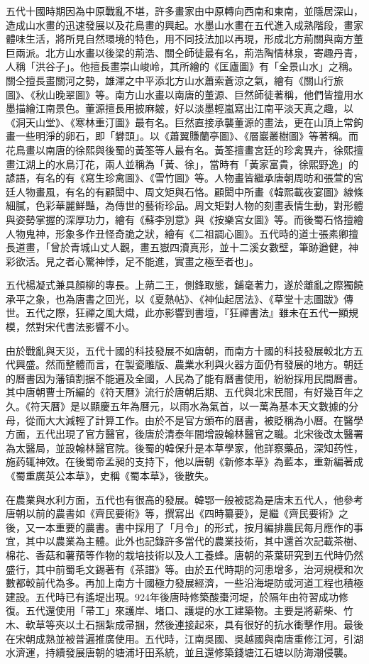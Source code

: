 五代十國時期因為中原戰亂不堪，許多畫家由中原轉向西南和東南，並隱居深山，造成山水畫的迅速發展以及花鳥畫的興起。水墨山水畫在五代進入成熟階段，畫家體味生活，將所見自然環境的特色，用不同技法加以再現，形成北方荊關與南方董巨兩派。北方山水畫以後梁的荊浩、關仝師徒最有名，荊浩陶情林泉，寄趣丹青，人稱「洪谷子」。他擅長畫崇山峻岭，其所繪的《匡廬圖》有「全景山水」之稱。關仝擅長畫關河之勢，雄渾之中平添北方山水蕭索蒼涼之氣，繪有《關山行旅圖》、《秋山晚翠圖》等。南方山水畫以南唐的董源、巨然師徒著稱，他們皆擅用水墨描繪江南景色。董源擅長用披麻皴，好以淡墨輕嵐寫出江南平淡天真之趣，以《洞天山堂》、《寒林重汀圖》最有名。巨然直接承襲董源的畫法，更在山頂上常鉤畫一些明淨的卵石，即「礬頭」。以《蕭翼賺蘭亭圖》、《層巖叢樹圖》等著稱。而花鳥畫以南唐的徐熙與後蜀的黃筌等人最有名。黃筌擅畫宮廷的珍禽異卉，徐熙擅畫江湖上的水鳥汀花，兩人並稱為「黃、徐」，當時有「黃家富貴，徐熙野逸」的諺語，有名的有《寫生珍禽圖》、《雪竹圖》等。人物畫皆繼承唐朝周昉和張萱的宮廷人物畫風，有名的有顧閎中、周文矩與石恪。顧閎中所畫《韓熙載夜宴圖》線條細膩，色彩華麗鮮豔，為傳世的藝術珍品。周文矩對人物的刻畫表情生動，對形體與姿勢掌握的深厚功力，繪有《蘇李別意》與《按樂宮女圖》等。而後蜀石恪擅繪人物鬼神，形象多作丑怪奇詭之狀，繪有《二祖調心圖》。五代時的道士張素卿擅長道畫，「曾於青城山丈人觀，畫五嶽四瀆真形，並十二溪女數壁，筆跡遒健，神彩欲活。見之者心驚神悸，足不能進，實畫之極至者也」。

五代楊凝式兼具顏柳的專長。上蒴二王，側鋒取態，鋪毫著力，遂於離亂之際獨饒承平之象，也為唐書之回光，以《夏熱帖》、《神仙起居法》、《草堂十志圖跋》傳世。五代之際，狂禪之風大熾，此亦影響到書壇，『狂禪書法』雖未在五代一顯規模，然對宋代書法影響不小。

由於戰亂與天災，五代十國的科技發展不如唐朝，而南方十國的科技發展較北方五代興盛。然而整體而言，在製瓷雕版、農業水利與火器方面仍有發展的地方。朝廷的曆書因为藩镇割据不能遍及全國，人民為了能有曆書使用，紛紛採用民間曆書。其中唐朝曹士所編的《符天曆》流行於唐朝后期、五代與北宋民間，有好幾百年之久。《符天曆》是以顯慶五年為曆元，以雨水為氣首，以一萬為基本天文數據的分母，從而大大減輕了計算工作。由於不是官方頒布的曆書，被貶稱為小曆。在醫學方面，五代出現了官方醫官，後唐於清泰年間增設翰林醫官之職。北宋後改太醫署為太醫局，並設翰林醫官院。後蜀的韓保升是本草學家，他詳察藥品，深知药性，施药辄神效。在後蜀帝孟昶的支持下，他以唐朝《新修本草》為藍本，重新編著成《蜀重廣英公本草》，史稱《蜀本草》，後散失。

在農業與水利方面，五代也有很高的發展。韓鄂一般被認為是唐末五代人，他參考唐朝以前的農書如《齊民要術》等，撰寫出《四時纂要》，是繼《齊民要術》之後，又一本重要的農書。書中採用了「月令」的形式，按月編排農民每月應作的事宜，其中以農業為主體。此外也記錄許多當代的農業技術，其中還首次記載茶樹、棉花、香菇和薯蕷等作物的栽培技術以及人工養蜂。唐朝的茶葉研究到五代時仍然盛行，其中前蜀毛文錫著有《茶譜》等。由於五代時期的河患增多，治河規模和次數都較前代為多。再加上南方十國極力發展經濟，一些沿海堤防或河道工程也積極建設。五代時已有遙堤出現。924年後唐時修築酸棗河堤，於隔年由符習成功修復。五代還使用「帚工」來護岸、堵口、護堤的水工建築物。主要是將薪柴、竹木、軟草等夾以土石捆紮成帚捆，然後連接起來，具有很好的抗水衝擊作用。最後在宋朝成熟並被普遍推廣使用。五代時，江南吳國、吳越國與南唐重修江河，引湖水濟運，持續發展唐朝的塘浦圩田系統，並且還修築錢塘江石塘以防海潮侵襲。

